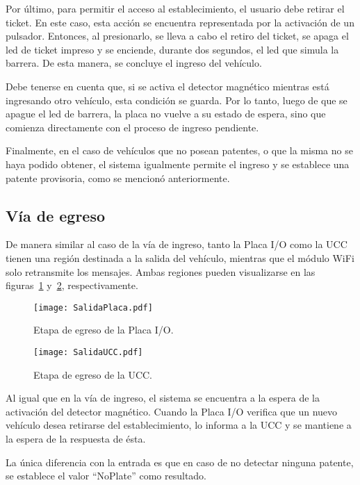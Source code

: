 Por último, para permitir el acceso al establecimiento, el usuario debe retirar el ticket. En este caso, esta acción se encuentra representada por la activación de un pulsador. Entonces, al presionarlo, se lleva a cabo el retiro del ticket, se apaga el led de ticket impreso y se enciende, durante dos segundos, el led que simula la barrera. De esta manera, se concluye el ingreso del vehículo.

Debe tenerse en cuenta que, si se activa el detector magnético mientras está ingresando otro vehículo, esta condición se guarda. Por lo tanto, luego de que se apague el led de barrera, la placa no vuelve a su estado de espera, sino que comienza directamente con el proceso de ingreso pendiente.

Finalmente, en el caso de vehículos que no posean patentes, o que la misma no se haya podido obtener, el sistema igualmente permite el ingreso y se establece una patente provisoria, como se mencionó anteriormente.


\subsection{Vía de egreso}

De manera similar al caso de la vía de ingreso, tanto la Placa I/O como la UCC tienen una región destinada a la salida del vehículo, mientras que el módulo WiFi solo retransmite los mensajes. Ambas regiones pueden visualizarse en las figuras~\ref{fig:img_SalidaPlaca} y~\ref{fig:img_SalidaUCC}, respectivamente.

\begin{figure}[H]
	\centering
	\texttt{[image: SalidaPlaca.pdf]}
	\caption{Etapa de egreso de la Placa I/O.}
	\label{fig:img_SalidaPlaca}
\end{figure}

\begin{figure}[H]
	\centering
	\texttt{[image: SalidaUCC.pdf]}
	\caption{Etapa de egreso de la UCC.}
	\label{fig:img_SalidaUCC}
\end{figure}

Al igual que en la vía de ingreso, el sistema se encuentra a la espera de la activación del detector magnético. Cuando la Placa I/O verifica que un nuevo vehículo desea retirarse del establecimiento, lo informa a la UCC y se mantiene a la espera de la respuesta de ésta.

La única diferencia con la entrada es que en caso de no detectar ninguna patente, se establece el valor ``NoPlate'' como resultado. 

